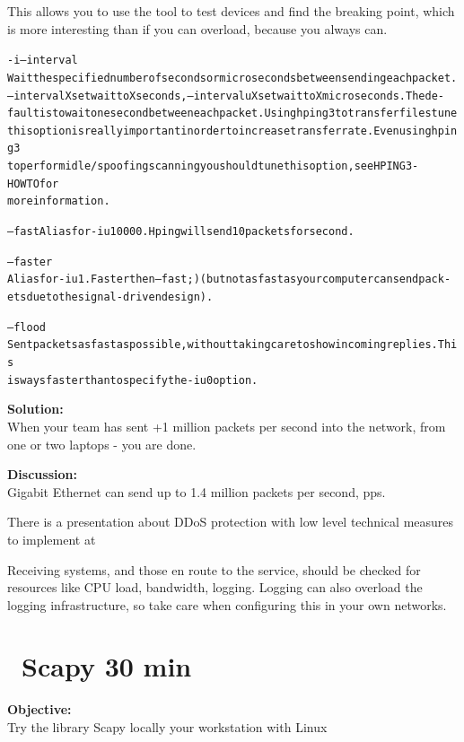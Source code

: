 \documentclass[a4paper,11pt,notitlepage]{report}
\begin{document}
This allows you to use the tool to test devices and find the breaking point, which is more interesting than if you can overload, because you always can.
\begin{alltt}\footnotesize
-i --interval
       Wait  the  specified  number  of  seconds or micro seconds between sending each packet.
       --interval X set wait to X seconds, --interval uX set wait to X micro seconds.  The de‐
       fault  is  to  wait one second between each packet. Using hping3 to transfer files tune
       this option is really important in order to increase transfer rate. Even  using  hping3
       to  perform  idle/spoofing  scanning  you should tune this option, see HPING3-HOWTO for
       more information.

--fast Alias for -i u10000. Hping will send 10 packets for second.

--faster
       Alias for -i u1. Faster then --fast ;) (but not as fast as your computer can send pack‐
       ets due to the signal-driven design).

--flood
       Sent  packets  as fast as possible, without taking care to show incoming replies.  This
       is ways faster than to specify the -i u0 option.
\end{alltt}

{\bf Solution:}\\
When your team has sent +1 million packets per second into the network, from one or two laptops - you are done.

{\bf Discussion:}\\
Gigabit Ethernet can send up to 1.4 million packets per second, pps.

There is a presentation about DDoS protection with low level technical measures to implement at\\
{\footnotesize {}}

Receiving systems, and those en route to the service, should be checked for resources like CPU load, bandwidth, logging. Logging can also overload the logging infrastructure, so take care when configuring this in your own networks.

\chapter{\faInfoCircle\ Scapy 30 min}
\label{ex:scapy}

{\bf Objective:}\\
Try the library Scapy locally your workstation with Linux
\end{document}
